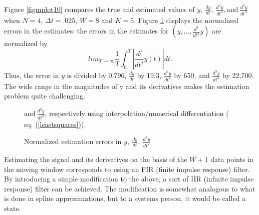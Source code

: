 Figure \ref{figmplot10} compares the true and estimated values of
$y, \ \frac{dy}{dt}, \
\frac{d^2y}{dt^2}, \mbox{and} \
\frac{d^3y}{dt^3}$ when $N=4$, $\Delta t = .025$, $W=8$ and $K=5$. 
Figure \ref{figsineinterp} displays the normalized errors
in the estimates: the errors in the estimates 
for $(y, \ldots, \frac{d^3}{dt^3}y)$ are normalized
by 
\begin{equation}
lim_{T \rightarrow \infty} \frac{1}{T} \int_{0}^{T}{|\frac{d^j}{dt^j}y(t)| dt}.
\label{scales}
\end{equation}
Thus, the error in $y$ is divided by 0.796, $\frac{dy}{dt}$ by 19.3,
$\frac{d^2y}{dt^2}$ by 650, 
and $\frac{d^3y}{dt^3}$ by 22,700.  The wide range in the magnitudes of y
and its derivatives makes the
estimation problem quite challenging.


\begin{figure}[hbt]
\centerline{}
\smallskip
\small
\caption{\small Normalized estimation errors in $y, \ \frac{dy}{dt}, \
\frac{d^2y}{dt^2}$} 
$\mbox{and} \
\frac{d^3y}{dt^3}$, respectively using interpolation/numerical differentiation 
( eq. \protect (\ref{leastsquares})).
\label{figsineinterp}
\end{figure}


Estimating the signal and its derivatives on the basis of 
the $W + 1$ data points in the moving window corresponds to using
an FIR (finite impulse response) 
filter.  By introducing a simple modification
to the above, a sort of IIR (infinite
impulse response) filter can be achieved.  The modification is somewhat
analogous to 
what is done in spline
approximations, but to a systems person, it would be called a state.

